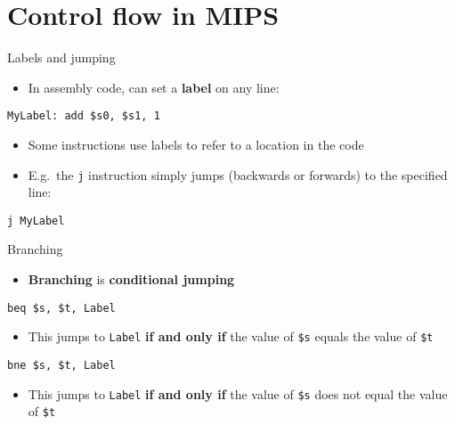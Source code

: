 \part{Control flow in MIPS}
\frame{\partpage}

\begin{frame}[fragile]{Labels and jumping}
	\begin{itemize}
		\pause\item In assembly code, can set a \textbf{label} on any line:
	\end{itemize}
	\begin{lstlisting}
MyLabel: add $s0, $s1, 1
	\end{lstlisting}
	\begin{itemize}
		\pause\item Some instructions use labels to refer to a location in the code
		\pause\item E.g.\ the \lstinline{j} instruction
			simply jumps (backwards or forwards) to the specified line:
	\end{itemize}
	\begin{lstlisting}
j MyLabel
	\end{lstlisting}
\end{frame}

\begin{frame}[fragile]{Branching}
	\begin{itemize}
		\pause\item \textbf{Branching} is \textbf{conditional jumping}
	\end{itemize}
	\pause\begin{lstlisting}
beq $s, $t, Label
	\end{lstlisting}
	\begin{itemize}
		\pause\item This jumps to \lstinline{Label} \textbf{if and only if}
			the value of \lstinline{$s} equals the value of \lstinline{$t}
	\end{itemize}
	\pause\begin{lstlisting}
bne $s, $t, Label
	\end{lstlisting}
	\begin{itemize}
		\pause\item This jumps to \lstinline{Label} \textbf{if and only if}
			the value of \lstinline{$s} does not equal the value of \lstinline{$t}
	\end{itemize}
\end{frame}

